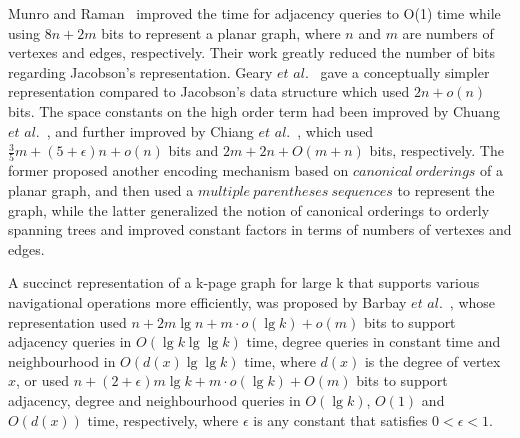 \documentclass[12pt,glossary]{dalthesis}
\begin{document}
Munro and Raman~\cite{Munro} improved the time for adjacency queries to O(1) time while using $8n+2m$ bits to represent a planar graph, where $n$ and $m$ are numbers of vertexes and edges, respectively. Their work greatly reduced the number of bits regarding Jacobson's representation. Geary $et$ $al.$~\cite{Geary} gave a conceptually simpler representation compared to Jacobson's data structure which used $2n+o(n)$ bits. The space constants on the high order term had been improved by Chuang $et$ $al.$~\cite{Chuang}, and further improved by Chiang $et$ $al.$~\cite{Chiang}, which used $\frac{3}{5} m + (5+ \epsilon )n + o(n)$ bits and  $2m+2n+O(m+n)$ bits, respectively. The former proposed another encoding mechanism based on $canonical \ orderings$ of a planar graph, and then used a $multiple \ parentheses \ sequences$ to represent the graph, while the latter generalized the notion of canonical orderings to orderly spanning trees and improved constant factors in terms of numbers of vertexes and edges. 

\bigskip
\bigskip

A succinct representation of a k-page graph for large k that supports various navigational operations more efficiently, was proposed by Barbay $et$ $al.$~\cite{Barbay}, whose representation used $n+2m\lg n + m \cdot o(\lg k) + o(m)$ bits to support adjacency queries in $O(\lg k \lg \lg k)$ time, degree queries in constant time and neighbourhood in $O(d(x) \lg \lg k)$ time, where $d(x)$ is the degree of vertex $x$, or used $n+(2+\epsilon)m\lg k + m \cdot o(\lg k) + O(m)$ bits to support adjacency, degree and neighbourhood queries in $O(\lg k)$, $O(1)$ and $O(d(x))$ time, respectively, where $\epsilon$ is any constant that satisfies $0< \epsilon <1$.   

\bigskip
\end{document}
